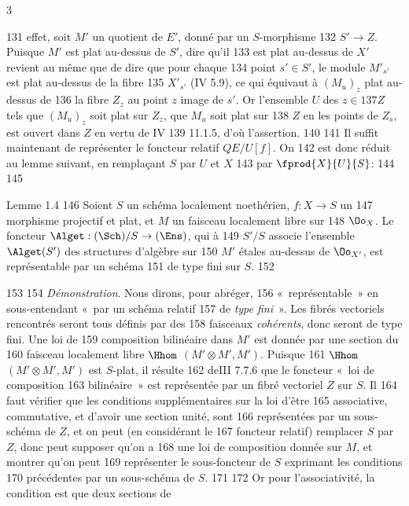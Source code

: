 3	\documentclass[10pt]{../fichiers-configuration-latex/smfart}
\begin{document}
   131	effet, soit $M'$ un quotient de $E'$, donné par un $S$-morphisme
   132	$S'\rightarrow Z$. Puisque $M'$ est plat au-dessus de $S'$, dire qu'il
   133	est plat au-dessus de $X'$ revient au même que de dire que pour chaque
   134	point $s'\in S'$, le module $M'_{s'}$ est plat au-dessus de la fibre
   135	$X'_{s'}$ (\EGA IV 5.9), ce qui équivaut à $(M_u)_z$ plat au-dessus de
   136	la fibre $Z_z$ au point $z$ image de $s'$. Or l'ensemble $U$ des $z\in
   137	Z$ tels que $(M_u)_z$ soit plat sur $Z_z$, \ie que $M_u$ soit plat sur
   138	$Z$ en les points de $Z_s$, est ouvert dans $Z$ en vertu de \EGA IV
   139	11.1.5, d'où l'assertion.
   140	
   141	Il suffit maintenant de représenter le foncteur relatif $QE/U[f]$. On
   142	est donc réduit au lemme suivant, en remplaçant $S$ par $U$ et $X$
   143	par $\fprod{X}{U}{S}$:
   144	
   145	\begin{enonce*}{Lemme 1.4}
   146	Soient $S$ un schéma localement noethérien, $f:X\rightarrow S$ un
   147	morphisme projectif et plat, et $M$ un faisceau localement libre sur
   148	$\Oo_X$. Le foncteur $\Alget:(\Sch)/S\rightarrow (\Ens)$, qui à
   149	$S'/S$ associe l'ensemble $\Alget(S')$ des structures d'algèbre sur
   150	$M'$ étales au-dessus de $\Oo_{X'}$, est représentable par un schéma
   151	de type fini sur $S$.
   152	\end{enonce*}
   153	
   154		\emph{Démonstration}. Nous dirons, pour abréger,
   156	« représentable » en sous-entendant « par un schéma relatif
   157	de \emph{type fini} ». Les fibrés vectoriels rencontrés seront tous définis par des
   158	faisceaux \emph{cohérents}, donc seront de type fini. Une loi de
   159	composition bilinéaire dans $M'$ est donnée par une section du
   160	faisceau localement libre $\Hhom$ $(M'\otimes M', M')$. Puisque
   161	$\Hhom$ $(M'\otimes M', M')$ est $S$-plat, il résulte
   162	de\pageoriginale \EGA III 7.7.6 que le foncteur « loi de composition
   163	bilinéaire » est représentée par un fibré vectoriel $Z$ sur $S$. Il
   164	faut vérifier que les conditions supplémentaires sur la loi d'être
   165	associative, commutative, et d'avoir une section unité, sont
   166	représentées par un sous-schéma de $Z$, et on peut (en considérant le
   167	foncteur relatif) remplacer $S$ par $Z$, donc peut supposer qu'on a
   168	une loi de composition donnée sur $M$, et montrer qu'on peut
   169	représenter le sous-foncteur de $S$ exprimant les conditions
   170	précédentes par un sous-schéma de $S$.
   171	
   172	Or pour l'associativité, la condition est que deux sections de
\end{document}
